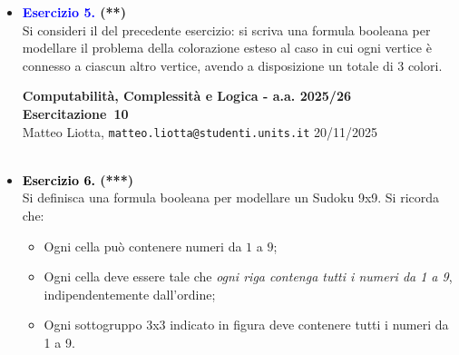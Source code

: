 \documentclass[a4paper,10pt]{article}
\makeatletter
\newcommand{\EsercitazioneNum}{10}
\newcommand{\Data}{20/11/2025}
\newcommand{\DocType}{Esercitazione} %
\newcommand{\FullTitle}{\DocType\ \EsercitazioneNum}
\newcommand{\Header}{
\noindent
  \small \textbf{Computabilità, Complessità e Logica - a.a. 2025/26} \hfill \textbf{\FullTitle} \\[0.2cm]
  \scriptsize Matteo Liotta, \texttt{matteo.liotta@studenti.units.it} \hfill \Data \\[0.2cm]
  \noindent\makebox[\linewidth]{\rule{\linewidth}{0.4pt}} \\[0.3cm]}
\newcommand{\NewPageHeader}{
  \vfill
  \noindent\makebox[\linewidth]{\rule{\linewidth}{0.4pt}}
  \newpage
  {\Header}
}
\makeatother
\begin{document}
{\begin{itemize}[label=, leftmargin=0pt]
\begin{center}
    \end{center}
    
    si indichi se possibile modellare la colorazione $\{0,1\}$ per ciascun nodo, in modo che \textit{vertici adiacenti non abbiano lo stesso colore}. 

    \item \textbf{\textcolor{blue}{Esercizio 5.} (**)}\\ 
    Si consideri il del precedente esercizio: si scriva una formula booleana per modellare il problema della colorazione esteso al caso in cui ogni vertice è connesso a ciascun altro vertice, avendo a disposizione un totale di 3 colori.
    
    \begin{center}
    \end{center}

    \NewPageHeader

    \item \textbf{\textcolor{black}{Esercizio 6.} (***)}\\ 
    Si definisca una formula booleana per modellare un Sudoku 9x9. Si ricorda che:
    \begin{itemize}
        \item Ogni cella può contenere numeri da $1$ a $9$;
        \item Ogni cella deve essere tale che \textit{ogni riga contenga tutti i numeri da 1 a 9}, indipendentemente dall'ordine;
        \item Ogni sottogruppo 3x3 indicato in figura deve contenere tutti i numeri da 1 a 9.
    \end{itemize}



\end{itemize}}
\end{document}
